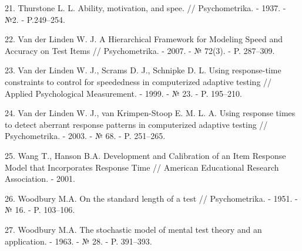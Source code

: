 \documentclass[14pt, a4paper]{extarticle}
\numberwithin{equation}{section}
\begin{document}
21.	Thurstone L. L. Ability, motivation, and spee. // Psychometrika. - 1937. - №2. - P.249–254.

22.	Van der Linden W. J. A Hierarchical Framework for Modeling Speed and Accuracy on Test Items // Psychometrika. - 2007. - № 72(3). - P. 287–309.

23.	Van der Linden W. J., Scrams D. J., Schnipke D. L. Using response-time constraints to control for speededness in computerized adaptive testing // Applied Psychological Measurement. - 1999. - № 23. - P. 195–210.

24.	Van der Linden W. J., van Krimpen-Stoop E. M. L. A. Using response times to detect aberrant response patterns in computerized adaptive testing // Psychometrika. - 2003. - № 68. - P. 251–265.

25.	Wang T., Hanson B.A. Development and Calibration of an Item Response Model that Incorporates Response Time // American Educational Research Association. - 2001.

26.	Woodbury M.A. On the standard length of a test // Psychometrika. - 1951. - № 16. - P. 103–106.

27.	Woodbury M.A. The stochastic model of mental test theory and an application. - 1963. - № 28. - P. 391–393.
\end{document}
